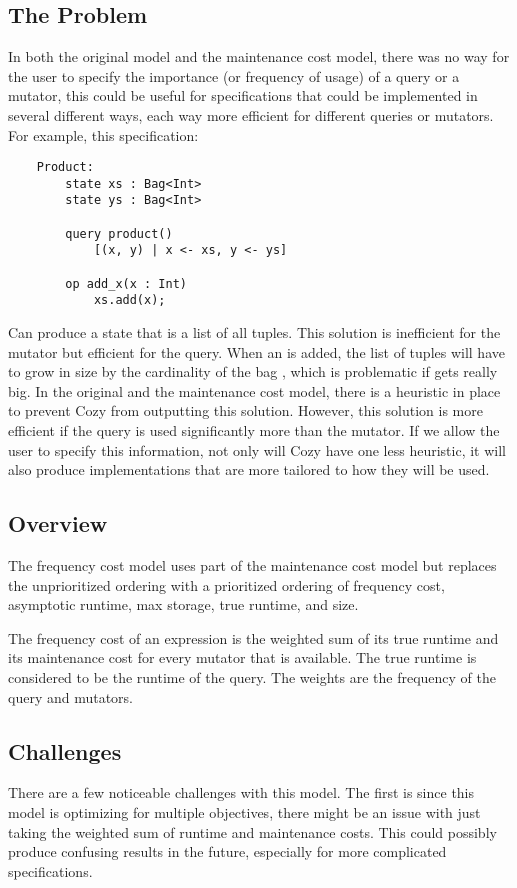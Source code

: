 \subsection{The Problem}
In both the original model and the maintenance cost model, there was no way for
the user to specify the importance (or frequency of usage) of a query or a
mutator, this could be useful for specifications that could be implemented in
several different ways, each way more efficient for different queries or
mutators. For example, this specification:

\begin{lstlisting}
    Product:
        state xs : Bag<Int>
        state ys : Bag<Int>

        query product()
            [(x, y) | x <- xs, y <- ys]

        op add_x(x : Int)
            xs.add(x);
\end{lstlisting}

Can produce a state that is a list of all  tuples. This solution is
inefficient for the mutator but efficient for the query. When an  is
added, the list of tuples will have to grow in size by the cardinality of the bag
, which is problematic if  gets really big. In the original
and the maintenance cost model, there is a heuristic in place to prevent Cozy
from outputting this solution. However, this solution is more efficient if
the query is used significantly more than the mutator. If we allow the user to
specify this information, not only will Cozy have one less heuristic, it will
also produce implementations that are more tailored to how they will be used.

\subsection{Overview}
The frequency cost model uses part of the maintenance cost model but replaces
the unprioritized ordering with a prioritized ordering of frequency cost,
asymptotic runtime, max storage, true runtime, and size.

The frequency cost of an expression is the weighted sum of its true runtime and
its maintenance cost for every mutator that is available. The true runtime is
considered to be the runtime of the query. The weights are the frequency of the
query and mutators.

\subsection{Challenges}
There are a few noticeable challenges with this model. The first is since this
model is optimizing for multiple objectives, there might be an issue with just
taking the weighted sum of runtime and maintenance costs. This could possibly
produce confusing results in the future, especially for more complicated
specifications.

